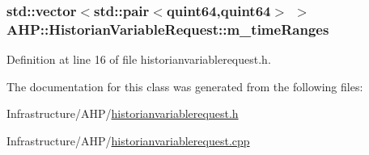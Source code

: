 \subsubsection[{m\+\_\+time\+Ranges}]{\setlength{\rightskip}{0pt plus 5cm}std\+::vector$<$std\+::pair$<$quint64,quint64$>$ $>$ A\+H\+P\+::\+Historian\+Variable\+Request\+::m\+\_\+time\+Ranges\hspace{0.3cm}{\ttfamily [protected]}}\label{class_a_h_p_1_1_historian_variable_request_ad71c11988971419306235cb25c1a32f0}


Definition at line 16 of file historianvariablerequest.\+h.



The documentation for this class was generated from the following files\+:\begin{DoxyCompactItemize}
\item 
Infrastructure/\+A\+H\+P/\hyperlink{historianvariablerequest_8h}{historianvariablerequest.\+h}\item 
Infrastructure/\+A\+H\+P/\hyperlink{historianvariablerequest_8cpp}{historianvariablerequest.\+cpp}\end{DoxyCompactItemize}
